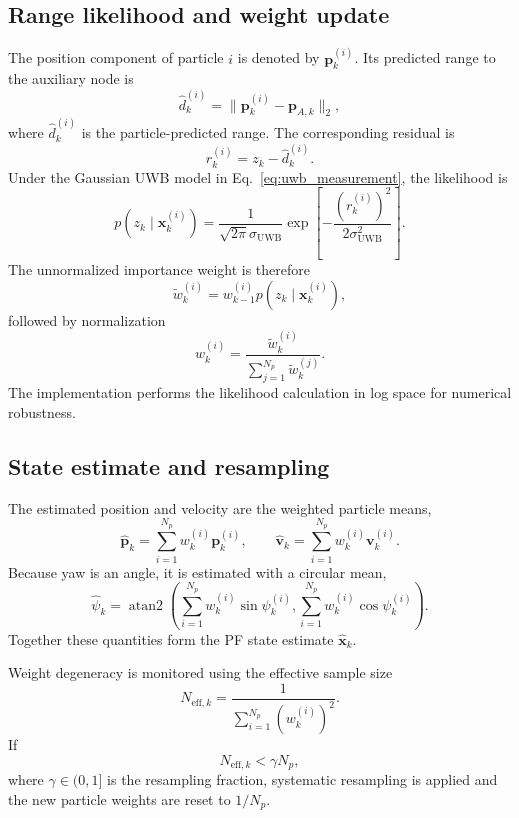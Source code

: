 \subsection{Range likelihood and weight update}
The position component of particle $i$ is denoted by $\bm{p}_k^{(i)}$. Its predicted range to the auxiliary node is
\begin{equation}
\hat d_k^{(i)}=\lVert\bm{p}_k^{(i)}-\bm{p}_{A,k}\rVert_2,
\end{equation}
where $\hat d_k^{(i)}$ is the particle-predicted range. The corresponding residual is
\begin{equation}
r_k^{(i)}=z_k-\hat d_k^{(i)}.
\end{equation}
Under the Gaussian UWB model in Eq.~\eqref{eq:uwb_measurement}, the likelihood is
\begin{equation}
p(z_k\mid\bm{x}_k^{(i)})
=\frac{1}{\sqrt{2\pi}\sigma_{\mathrm{UWB}}}
\exp\!\left[-\frac{(r_k^{(i)})^2}{2\sigma_{\mathrm{UWB}}^2}\right].
\end{equation}
The unnormalized importance weight is therefore
\begin{equation}
\tilde w_k^{(i)}=w_{k-1}^{(i)}p(z_k\mid\bm{x}_k^{(i)}),
\end{equation}
followed by normalization
\begin{equation}
w_k^{(i)}=\frac{\tilde w_k^{(i)}}{\sum_{j=1}^{N_p}\tilde w_k^{(j)}}.
\end{equation}
The implementation performs the likelihood calculation in log space for numerical robustness.

\subsection{State estimate and resampling}
The estimated position and velocity are the weighted particle means,
\begin{equation}
\hat{\bm{p}}_k=\sum_{i=1}^{N_p}w_k^{(i)}\bm{p}_k^{(i)},
\qquad
\hat{\bm{v}}_k=\sum_{i=1}^{N_p}w_k^{(i)}\bm{v}_k^{(i)}.
\end{equation}
Because yaw is an angle, it is estimated with a circular mean,
\begin{equation}
\hat\psi_k=\operatorname{atan2}\!\left(
\sum_{i=1}^{N_p}w_k^{(i)}\sin\psi_k^{(i)},
\sum_{i=1}^{N_p}w_k^{(i)}\cos\psi_k^{(i)}
\right).
\end{equation}
Together these quantities form the PF state estimate $\hat{\bm{x}}_k$.

Weight degeneracy is monitored using the effective sample size
\begin{equation}
N_{\mathrm{eff},k}=\frac{1}{\sum_{i=1}^{N_p}(w_k^{(i)})^2}.
\end{equation}
If
\begin{equation}
N_{\mathrm{eff},k}<\gamma N_p,
\end{equation}
where $\gamma\in(0,1]$ is the resampling fraction, systematic resampling is applied and the new particle weights are reset to $1/N_p$.

